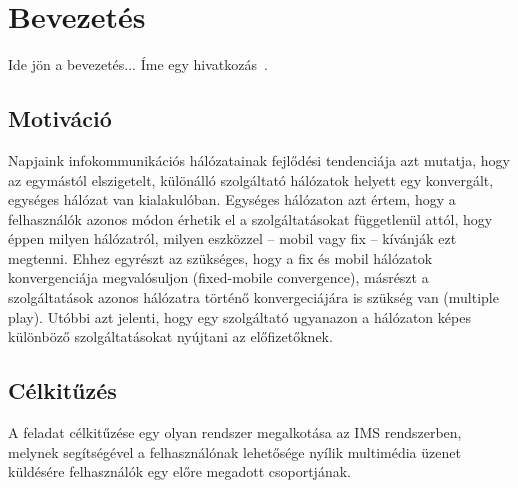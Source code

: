 
\section{Bevezetés}

Ide jön a bevezetés... Íme egy hivatkozás~\cite{KonyvId}.

\subsection{Motiváció}

Napjaink infokommunikációs hálózatainak fejlődési tendenciája azt mutatja, hogy az egymástól elszigetelt,
különálló szolgáltató hálózatok helyett egy konvergált, egységes hálózat van kialakulóban. Egységes hálózaton azt értem, hogy a felhasználók azonos módon érhetik el a szolgáltatásokat függetlenül attól, hogy éppen milyen hálózatról, milyen eszközzel -- mobil vagy fix -- kívánják ezt megtenni. Ehhez egyrészt az szükséges, hogy a fix és mobil hálózatok konvergenciája megvalósuljon (fixed-mobile convergence), másrészt a szolgáltatások azonos hálózatra történő konvergeciájára is szükség van (multiple play). Utóbbi azt jelenti, hogy egy szolgáltató ugyanazon a hálózaton képes különböző szolgáltatásokat nyújtani az előfizetőknek.

\subsection{Célkitűzés}

A feladat célkitűzése egy olyan rendszer megalkotása az IMS rendszerben, melynek
segítségével a felhasználónak lehetősége nyílik multimédia üzenet küldésére felhasználók egy előre megadott csoportjának. 

